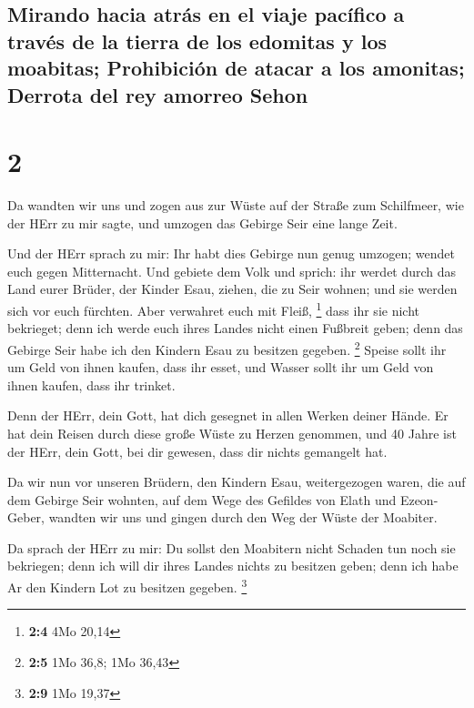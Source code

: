 \hypertarget{mirando-hacia-atruxe1s-en-el-viaje-pacuxedfico-a-travuxe9s-de-la-tierra-de-los-edomitas-y-los-moabitas-prohibiciuxf3n-de-atacar-a-los-amonitas-derrota-del-rey-amorreo-sehon}{%
\subsection{Mirando hacia atrás en el viaje pacífico a través de la
tierra de los edomitas y los moabitas; Prohibición de atacar a los
amonitas; Derrota del rey amorreo
Sehon}\label{mirando-hacia-atruxe1s-en-el-viaje-pacuxedfico-a-travuxe9s-de-la-tierra-de-los-edomitas-y-los-moabitas-prohibiciuxf3n-de-atacar-a-los-amonitas-derrota-del-rey-amorreo-sehon}}

\hypertarget{section-1}{%
\section{2}\label{section-1}}

 Da wandten wir uns und zogen aus zur Wüste auf der Straße
zum Schilfmeer, wie der HErr zu mir sagte, und umzogen das Gebirge Seir
eine lange Zeit.

 Und der HErr sprach zu mir:  Ihr habt dies
Gebirge nun genug umzogen; wendet euch gegen Mitternacht. 
Und gebiete dem Volk und sprich: ihr werdet durch das Land eurer Brüder,
der Kinder Esau, ziehen, die zu Seir wohnen; und sie werden sich vor
euch fürchten. Aber verwahret euch mit Fleiß, \footnote{\textbf{2:4} 4Mo
  20,14}  dass ihr sie nicht bekrieget; denn ich werde
euch ihres Landes nicht einen Fußbreit geben; denn das Gebirge Seir habe
ich den Kindern Esau zu besitzen gegeben. \footnote{\textbf{2:5} 1Mo
  36,8; 1Mo 36,43}  Speise sollt ihr um Geld von ihnen
kaufen, dass ihr esset, und Wasser sollt ihr um Geld von ihnen kaufen,
dass ihr trinket.

 Denn der HErr, dein Gott, hat dich gesegnet in allen
Werken deiner Hände. Er hat dein Reisen durch diese große Wüste zu
Herzen genommen, und 40 Jahre ist der HErr, dein Gott, bei dir gewesen,
dass dir nichts gemangelt hat.

 Da wir nun vor unseren Brüdern, den Kindern Esau,
weitergezogen waren, die auf dem Gebirge Seir wohnten, auf dem Wege des
Gefildes von Elath und Ezeon-Geber, wandten wir uns und gingen durch den
Weg der Wüste der Moabiter.

 Da sprach der HErr zu mir: Du sollst den Moabitern nicht
Schaden tun noch sie bekriegen; denn ich will dir ihres Landes nichts zu
besitzen geben; denn ich habe Ar den Kindern Lot zu besitzen gegeben.
\footnote{\textbf{2:9} 1Mo 19,37}

